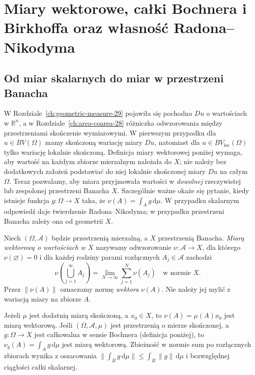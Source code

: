 \chapter[Miary wektorowe i własność Radona--Nikodyma]{Miary wektorowe, całki Bochnera i Birkhoffa oraz własność Radona--Nikodyma}
\label{ch:vector-measures-30}

\providecommand{\atlasref}[2]{#2}


\section{Od miar skalarnych do miar w przestrzeni Banacha}
\label{sec:vector-intro-30}
W Rozdziale~\ref{ch:geometric-measure-29} pojawiła się
pochodna $Du$ o wartościach w $\mathbb R^n$,
a w Rozdziale~\ref{ch:area-coarea-28} różniczka
odwzorowania między przestrzeniami skończenie wymiarowymi.
W pierwszym przypadku dla $u\in BV(\Omega)$ mamy
skończoną wariację miary $Du$, natomiast dla
$u\in BV_{\mathrm{loc}}(\Omega)$ tylko wariację
lokalnie skończoną. Definicja miary wektorowej
poniżej wymaga, aby wartość na każdym zbiorze
mierzalnym należała do $X$; nie należy bez dodatkowych
założeń podstawiać do niej lokalnie skończonej
miary $Du$ na całym $\Omega$. Teraz pozwalamy, aby miara przyjmowała
wartości w \emph{dowolnej} rzeczywistej lub zespolonej przestrzeni
Banacha $X$. Szczególnie ważne okaże się pytanie, kiedy istnieje
funkcja $g:\Omega\to X$ taka, że $\nu(A)=\int_Ag\,\mathrm d\mu$.
W przypadku skalarnym odpowiedź daje twierdzenie Radona--Nikodyma;
w przypadku przestrzeni Banacha zależy ona od geometrii $X$.

\begin{definicja}
\label{def:vector-measure-30}
Niech $(\Omega,\mathcal A)$ będzie przestrzenią mierzalną,
a $X$ przestrzenią Banacha. \emph{Miarą wektorową o wartościach w $X$}
nazywamy odwzorowanie $\nu:\mathcal A\to X$, dla którego
$\nu(\varnothing)=0$ i dla każdej rodziny parami rozłącznych
$A_j\in\mathcal A$ zachodzi
\[
 \nu\left(\bigcup_{j=1}^{\infty}A_j\right)
 =\lim_{N\to\infty}\sum_{j=1}^{N}\nu(A_j)
 \quad\text{w normie }X.
\]
Przez $\|\nu(A)\|$ oznaczamy normę \emph{wektora} $\nu(A)$.
Nie należy jej mylić z wariacją miary na zbiorze $A$.
\end{definicja}

\begin{przyklad}
\label{ex:basic-vector-measures-30}
Jeżeli $\mu$ jest dodatnią miarą skończoną, a $x_0\in X$,
to $\nu(A)=\mu(A)x_0$ jest miarą wektorową.
Jeśli $(\Omega,\mathcal A,\mu)$ jest przestrzenią o mierze
skończonej, a $g:\Omega\to X$ jest całkowalna w sensie
Bochnera (definicja poniżej), to
$\nu_g(A)=\int_Ag\,\mathrm d\mu$ jest miarą wektorową.
Zbieżność w normie sum po rozłącznych zbiorach
wynika z oszacowania
$\|\int_Bg\,\mathrm d\mu\|\le\int_B\|g\|\,\mathrm d\mu$
i bezwzględnej ciągłości całki skalarnej.
\end{przyklad}


